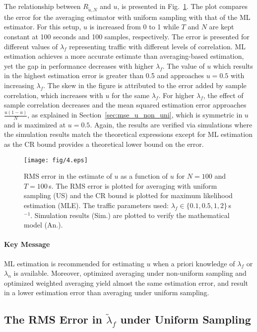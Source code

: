 \documentclass[11pt,draftclsnofoot,journal,onecolumn]{IEEEtran}
\begin{document}
The relationship between $R_{\tilde{u},N}$ and $u$, is presented in Fig.~\ref{fig:mse_u_u}. The plot compares the error for the averaging estimator with uniform sampling with that of the ML estimator. For this setup, $u$ is increased from 0 to 1 while $T$ and $N$ are kept constant at 100 seconds and 100 samples, respectively. The error is presented for different values of $\lambda_f$ representing traffic with different levels of correlation. ML estimation achieves a more accurate estimate than averaging-based estimation, yet the gap in performance decreases with higher $\lambda_f$. The value of $u$ which results in the highest estimation error is greater than 0.5 and approaches $u=0.5$ with increasing $\lambda_f$. The skew in the figure is attributed to the error added by sample correlation, which increases with $u$ for the same $\lambda_f$. For higher $\lambda_f$, the effect of sample correlation decreases and the mean squared estimation error approaches $\frac{u(1-u)}{N}$, as explained in Section~\ref{sec:mse_u_non_uni}, which is symmetric in $u$ and is maximized at $u=0.5$. Again, the results are verified via simulations where the simulation results match the theoretical expressions except for ML estimation as the CR bound provides a theoretical lower bound on the error.
\begin{figure}
\centering
\texttt{[image: fig/4.eps]}
\caption{RMS error in the estimate of $u$ as a function of $u$ for $N =100$ and $T=100$\,s. The RMS error is plotted for averaging with uniform sampling (US) and the CR bound is plotted for maximum likelihood estimation (MLE). The traffic parameters used: $\lambda_f\in\{0.1,0.5,1,2\}$\,s$^{-1}$. Simulation results (Sim.) are plotted to verify the mathematical model (An.).}
\label{fig:mse_u_u}
\end{figure}

\paragraph*{Key Message}

ML estimation is recommended for estimating $u$ when a priori knowledge of $\lambda_f$ or $\lambda_n$ is available. Moreover, optimized averaging under non-uniform sampling and optimized weighted averaging yield almost the same estimation error, and result in a lower estimation error than averaging under uniform sampling.

\subsection{The RMS Error in $\tilde{\lambda}_f$ under Uniform Sampling}
\label{sec:num_MSE_lf}
\end{document}
